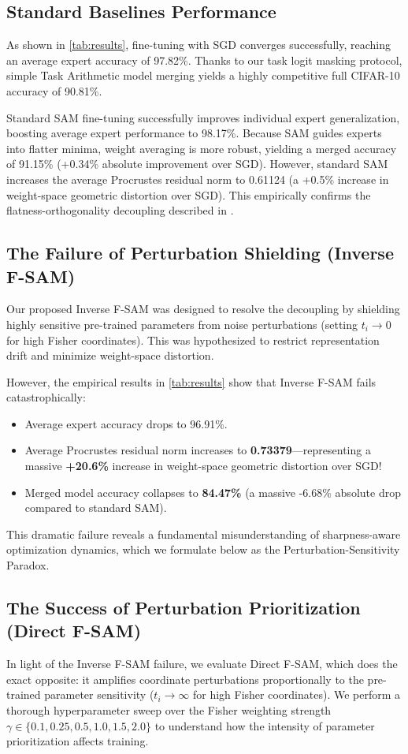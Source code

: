 \documentclass{article}
\theoremstyle{plain}
\theoremstyle{definition}
\theoremstyle{remark}
\begin{document}
\subsection{Standard Baselines Performance}
As shown in \cref{tab:results}, fine-tuning with SGD converges successfully, reaching an average expert accuracy of 97.82\%. Thanks to our task logit masking protocol, simple Task Arithmetic model merging yields a highly competitive full CIFAR-10 accuracy of 90.81\%.

Standard SAM fine-tuning successfully improves individual expert generalization, boosting average expert performance to 98.17\%. Because SAM guides experts into flatter minima, weight averaging is more robust, yielding a merged accuracy of 91.15\% (+0.34\% absolute improvement over SGD). However, standard SAM increases the average Procrustes residual norm to 0.61124 (a +0.5\% increase in weight-space geometric distortion over SGD). This empirically confirms the flatness-orthogonality decoupling described in \cite{spor25}.

\subsection{The Failure of Perturbation Shielding (Inverse F-SAM)}
Our proposed Inverse F-SAM was designed to resolve the decoupling by shielding highly sensitive pre-trained parameters from noise perturbations (setting $t_i \to 0$ for high Fisher coordinates). This was hypothesized to restrict representation drift and minimize weight-space distortion.

However, the empirical results in \cref{tab:results} show that Inverse F-SAM fails catastrophically:
\begin{itemize}\setlength{\itemsep}{0pt}\setlength{\parskip}{0pt}\setlength{\parsep}{0pt}
    \item Average expert accuracy drops to 96.91\%.
    \item Average Procrustes residual norm increases to \textbf{0.73379}—representing a massive \textbf{+20.6\%} increase in weight-space geometric distortion over SGD!
    \item Merged model accuracy collapses to \textbf{84.47\%} (a massive -6.68\% absolute drop compared to standard SAM).
\end{itemize}
This dramatic failure reveals a fundamental misunderstanding of sharpness-aware optimization dynamics, which we formulate below as the Perturbation-Sensitivity Paradox.

\subsection{The Success of Perturbation Prioritization (Direct F-SAM)}
In light of the Inverse F-SAM failure, we evaluate Direct F-SAM, which does the exact opposite: it amplifies coordinate perturbations proportionally to the pre-trained parameter sensitivity ($t_i \to \infty$ for high Fisher coordinates). We perform a thorough hyperparameter sweep over the Fisher weighting strength $\gamma \in \{0.1, 0.25, 0.5, 1.0, 1.5, 2.0\}$ to understand how the intensity of parameter prioritization affects training.
\end{document}
